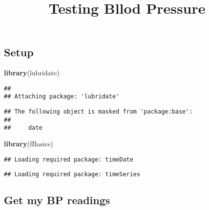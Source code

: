\documentclass[]{article}
\title{Testing Bllod Pressure}
\author{}
\date{}
\newenvironment{Shaded}{\begin{snugshade}}{\end{snugshade}}
\newcommand{\KeywordTok}[1]{\textcolor[rgb]{0.13,0.29,0.53}{\textbf{#1}}}
\newcommand{\NormalTok}[1]{#1}
\begin{document}
\maketitle

\hypertarget{setup}{%
\subsection{Setup}\label{setup}}

\begin{Shaded}
\begin{Highlighting}[]
\KeywordTok{library}\NormalTok{(lubridate)}
\end{Highlighting}
\end{Shaded}

\begin{verbatim}
## 
## Attaching package: 'lubridate'
\end{verbatim}

\begin{verbatim}
## The following object is masked from 'package:base':
## 
##     date
\end{verbatim}

\begin{Shaded}
\begin{Highlighting}[]
\KeywordTok{library}\NormalTok{(fBasics)}
\end{Highlighting}
\end{Shaded}

\begin{verbatim}
## Loading required package: timeDate
\end{verbatim}

\begin{verbatim}
## Loading required package: timeSeries
\end{verbatim}

\hypertarget{get-my-bp-readings}{%
\subsection{Get my BP readings}\label{get-my-bp-readings}}
\end{document}
